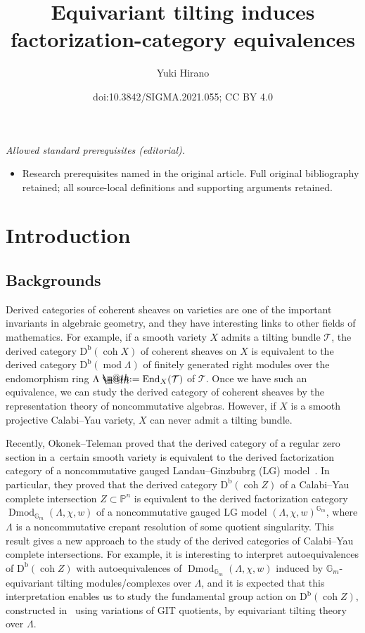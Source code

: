 \documentclass[10pt,a4paper]{amsart}
\title{Equivariant tilting induces factorization-category equivalences}
\author{Yuki Hirano}
\date{doi:10.3842/SIGMA.2021.055; CC BY 4.0}
\makeatletter
\newcommand*{\defeq}{\mathrel{\rlap{%
 \raisebox{0.3ex}{$\m@th\cdot$}}%
 \raisebox{-0.3ex}{$\m@th\cdot$}}%
 =}
\numberwithin{equation}{section}
\newcommand{\Dmod}{\operatorname{Dmod}}
\newcommand{\End}{\operatorname{End}}
\newcommand{\coh}{\operatorname{coh}}
\newcommand{\fmod}{\operatorname{mod}}
\newcommand{\Db}{\operatorname{D^b}}
\newcommand{\cT}{\mathcal{T}}
\newcommand{\bG}{\mathbb{G}}
\newcommand{\bP}{\mathbb{P}}
\makeatother
\begin{document}
\maketitle
\noindent\textit{Allowed standard prerequisites (editorial).}\begin{itemize}
\item Research prerequisites named in the original article. Full original bibliography retained; all source-local definitions and supporting arguments retained.
\end{itemize}\medskip
\section{Introduction}

\subsection{Backgrounds}
Derived categories of coherent sheaves on varieties are one of the important invariants in algebraic geometry, and they have interesting links to other fields of mathematics. For example, if a smooth variety $X$ admits a tilting bundle $\cT$, the derived category $\Db(\coh X)$ of coherent sheaves on $X$ is equivalent to the derived category $\Db(\fmod\Lambda)$ of finitely generated right modules over the endomorphism ring $\Lambda\defeq\End_X(\cT)$ of $\cT$.
Once we have such an equivalence, we can study the derived category of coherent sheaves by the representation theory of noncommutative algebras. However, if $X$ is a smooth projective Calabi--Yau variety, $X$ can never admit a tilting bundle.

Recently, Okonek--Teleman proved that the derived category of a regular zero section in a~certain smooth variety is equivalent to the derived factorization category of a noncommutative gauged Landau--Ginzbubrg (LG) model~\cite{ot}. In particular, they proved that the derived category $\Db(\coh Z)$ of a Calabi--Yau complete intersection $Z\subset \bP^n$ is equivalent to the derived factorization category $\Dmod_{\bG_m}(\Lambda,\chi,w)$ of a noncommutative gauged LG model $(\Lambda,\chi,w)^{\bG_m}$, where $\Lambda$ is a noncommutative crepant resolution of some quotient singularity. This result gives a new approach to the study of the derived categories of Calabi--Yau complete intersections. For example, it is interesting to interpret autoequivalences of $\Db(\coh Z)$ with autoequivalences of $\Dmod_{\bG_m}(\Lambda,\chi,w)$ induced by $\bG_m$-equivariant tilting modules/complexes over $\Lambda$, and it is expected that this interpretation enables us to study the fundamental group action on $\Db(\coh Z)$, constructed in~\cite{hl-s} using variations of GIT quotients, by equivariant tilting theory over $\Lambda$.
\end{document}
